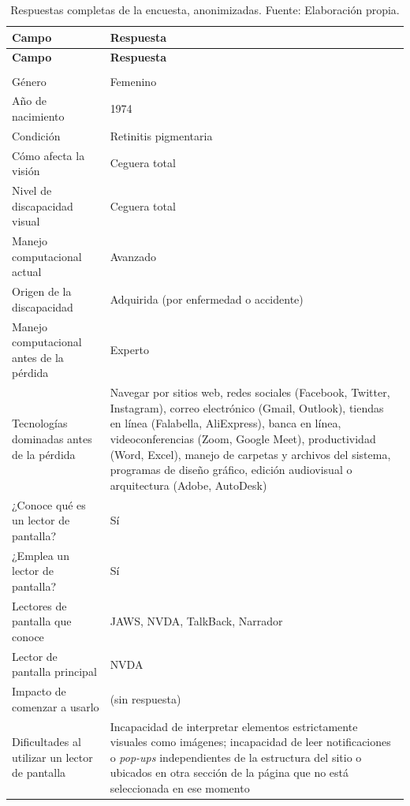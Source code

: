 \begin{longtable}{|p{4cm}|p{10.5cm}|}
    \caption{\label{table:respuestascompletas}Respuestas completas de la encuesta, anonimizadas. Fuente: Elaboración propia.} \\
    \hline
    \textbf{Campo} & \textbf{Respuesta} \\
    \hline
    \endfirsthead
    \hline
    \textbf{Campo} & \textbf{Respuesta} \\
    \hline
    \endhead
    \hline
    \endfoot

    \multicolumn{2}{|l|}{\textbf{Participante P1}} \\
    \hline
    Género & Femenino \\
    \hline
    Año de nacimiento & 1974 \\
    \hline
    Condición & Retinitis pigmentaria \\
    \hline
    Cómo afecta la visión & Ceguera total \\
    \hline
    Nivel de discapacidad visual & Ceguera total \\
    \hline
    Manejo computacional actual & Avanzado \\
    \hline
    Origen de la discapacidad & Adquirida (por enfermedad o accidente) \\
    \hline
    Manejo computacional antes de la pérdida & Experto \\
    \hline
    Tecnologías dominadas antes de la pérdida & Navegar por sitios web, redes sociales (Facebook, Twitter, Instagram), correo electrónico (Gmail, Outlook), tiendas en línea (Falabella, AliExpress), banca en línea, videoconferencias (Zoom, Google Meet), productividad (Word, Excel), manejo de carpetas y archivos del sistema, programas de diseño gráfico, edición audiovisual o arquitectura (Adobe, AutoDesk) \\
    \hline
    ¿Conoce qué es un lector de pantalla? & Sí \\
    \hline
    ¿Emplea un lector de pantalla? & Sí \\
    \hline
    Lectores de pantalla que conoce & JAWS, NVDA, TalkBack, Narrador \\
    \hline
    Lector de pantalla principal & NVDA \\
    \hline
    Impacto de comenzar a usarlo & (sin respuesta) \\
    \hline
    Dificultades al utilizar un lector de pantalla & Incapacidad de interpretar elementos estrictamente visuales como imágenes; incapacidad de leer notificaciones o \textit{pop-ups} independientes de la estructura del sitio o ubicados en otra sección de la página que no está seleccionada en ese momento \\

\end{longtable}
